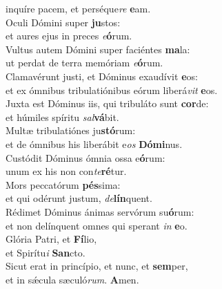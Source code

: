 \evenverse inquíre pacem, et perséque\textit{re} \textbf{e}am.\\
\oddverse Oculi Dómini super \textbf{ju}stos:~\*\\
\oddverse et aures ejus in preces \textit{e}\textbf{ó}rum.\\
\evenverse Vultus autem Dómini super faciéntes \textbf{ma}la:~\*\\
\evenverse ut perdat de terra memóriam \textit{e}\textbf{ó}rum.\\
\oddverse Clamavérunt justi, et Dóminus exaudívit \textbf{e}os:~\*\\
\oddverse et ex ómnibus tribulatiónibus eórum liberá\textit{vit} \textbf{e}os.\\
\evenverse Juxta est Dóminus iis, qui tribuláto sunt \textbf{cor}de:~\*\\
\evenverse et húmiles spíritu \textit{sal}\textbf{vá}bit.\\
\oddverse Multæ tribulatiónes ju\textbf{stó}rum:~\*\\
\oddverse et de ómnibus his liberábit e\textit{os} \textbf{Dó}\textbf{mi}nus.\\
\evenverse Custódit Dóminus ómnia ossa e\textbf{ó}rum:~\*\\
\evenverse unum ex his non con\textit{te}\textbf{ré}tur.\\
\oddverse Mors peccatórum \textbf{pés}sima:~\*\\
\oddverse et qui odérunt justum, \textit{de}\textbf{lín}quent.\\
\evenverse Rédimet Dóminus ánimas servórum su\textbf{ó}rum:~\*\\
\evenverse et non delínquent omnes qui sperant \textit{in} \textbf{e}o.\\
\oddverse Glória Patri, et \textbf{Fí}lio,~\*\\
\oddverse et Spirítu\textit{i} \textbf{San}cto.\\
\evenverse Sicut erat in princípio, et nunc, et \textbf{sem}per,~\*\\
\evenverse et in sǽcula sæculó\textit{rum}. \textbf{A}men.\\
